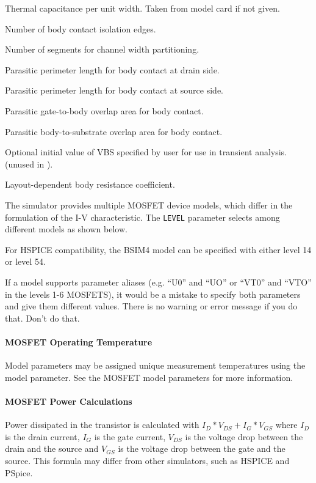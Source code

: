 \begin{Device}
\begin{Parameters}
Thermal capacitance per unit width.  Taken from model card if not given.

Number of body contact isolation edges.

Number of segments for channel width partitioning.

Parasitic perimeter length for body contact at drain side.

Parasitic perimeter length for body contact at source side.

Parasitic gate-to-body overlap area for body contact.

Parasitic body-to-substrate overlap area for body contact.

Optional initial value of VBS specified by user for use in transient
analysis.  (unused in \Xyce{}).

Layout-dependent body resistance coefficient.

\end{Parameters}

\comments

The simulator provides multiple MOSFET device models, which differ in the
formulation of the I-V characteristic. The \texttt{LEVEL} parameter
selects among different models as shown below.

For HSPICE compatibility, the BSIM4 model can be specified with either
level 14 or level 54.

If a model supports parameter aliases (e.g. ``U0'' and ``UO'' or
``VT0'' and ``VTO'' in the levels 1-6 MOSFETS), it would be a mistake
to specify both parameters and give them different values.  There is
no warning or error message if you do that.  Don't do that.

\end{Device}

\paragraph{MOSFET Operating Temperature}
Model parameters may be assigned unique measurement temperatures using the
 model parameter. See the MOSFET model parameters for more
information.

\paragraph{MOSFET Power Calculations}
Power dissipated in the transistor is calculated with $I_{D}*V_{DS}+I_{G}*V_{GS}$ where
$I_{D}$ is the drain current, $I_{G}$ is the gate current, $V_{DS}$ is the
voltage drop between the drain and the source and $V_{GS}$ is the voltage drop
between the gate and the source. This formula may differ from other simulators,
such as HSPICE and PSpice.

